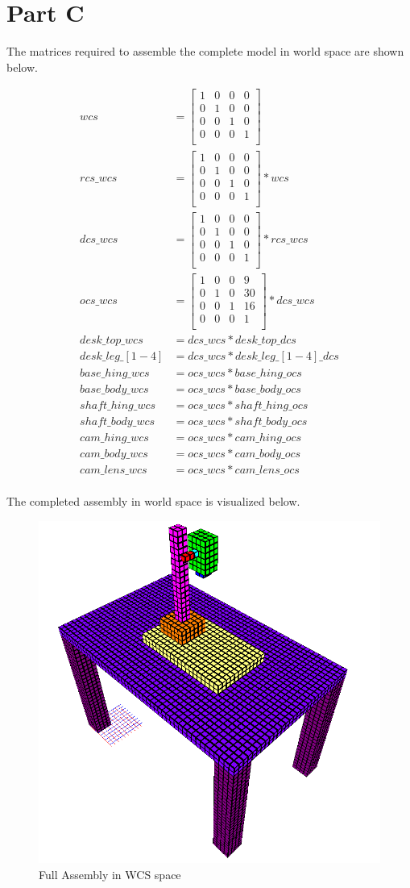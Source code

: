 \documentclass[12pt]{article}
\newcommand{\identity}{
    \begin{bmatrix}
        1 & 0 & 0 & 0 \\
        0 & 1 & 0 & 0 \\
        0 & 0 & 1 & 0 \\
        0 & 0 & 0 & 1 \\
    \end{bmatrix}
}
\newcommand{\trans}[3]{
    \begin{bmatrix}
        1 & 0 & 0 & #1 \\
        0 & 1 & 0 & #2 \\
        0 & 0 & 1 & #3 \\
        0 & 0 & 0 & 1 \\
    \end{bmatrix}
}
\begin{document}
\section*{Part C}

        The matrices required to assemble the complete
        model in world space are shown below.

        $$
        \begin{aligned}
            wcs               &= \identity \\
            rcs\_wcs          &= \trans{0}{0}{0} * wcs \\
            dcs\_wcs          &= \trans{0}{0}{0} * rcs\_wcs \\
            ocs\_wcs          &= \trans{9}{30}{16} * dcs\_wcs \\
            desk\_top\_wcs    &= dcs\_wcs * desk\_top\_dcs \\
            desk\_leg\_[1-4]  &= dcs\_wcs * desk\_leg\_[1-4]\_dcs \\
            base\_hing\_wcs   &= ocs\_wcs * base\_hing\_ocs \\
            base\_body\_wcs   &= ocs\_wcs * base\_body\_ocs \\
            shaft\_hing\_wcs  &= ocs\_wcs * shaft\_hing\_ocs \\
            shaft\_body\_wcs  &= ocs\_wcs * shaft\_body\_ocs \\
            cam\_hing\_wcs    &= ocs\_wcs * cam\_hing\_ocs \\
            cam\_body\_wcs    &= ocs\_wcs * cam\_body\_ocs \\
            cam\_lens\_wcs    &= ocs\_wcs * cam\_lens\_ocs \\
        \end{aligned}
        $$

        The completed assembly in world space is visualized below.

        \begin{figure}[H]
            \centering
            \includegraphics[width=0.25\linewidth]{../images/assembly.png}
            \caption{Full Assembly in WCS space}
        \end{figure}
\end{document}

